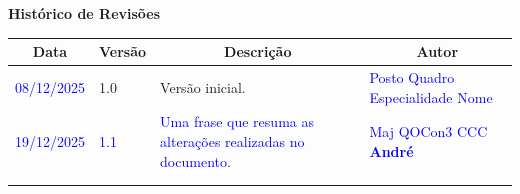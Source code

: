 \begin{table}[h]
	\begin{center}
	    \textbf{\Huge{Histórico de Revisões}}
	\end{center}
    \centering
	\begin{tabular}{|p{3cm}|p{1.5cm}|p{7.5cm}|p{3.2cm}|}
		\hline \multicolumn{1}{|c|}{\textbf{Data}} & \multicolumn{1}{|c|}{\textbf{Versão}} &
			\multicolumn{1}{|c|}{\textbf{Descrição}} & \multicolumn{1}{|c|}{\textbf{Autor}} \\ \hline
		\textcolor{blue}{08/12/2025} & 1.0 & Versão inicial. & \textcolor{blue}{Posto Quadro Especialidade Nome} \\ \hline
		\textcolor{blue}{19/12/2025} & \textcolor{blue}{1.1} & \textcolor{blue}{Uma frase que resuma as alterações realizadas no documento.} & \textcolor{blue}{Maj QOCon3 CCC \textbf{André}} \\ \hline
		& & & \\ \hline
		& & & \\ \hline
	\end{tabular}
\end{table}
